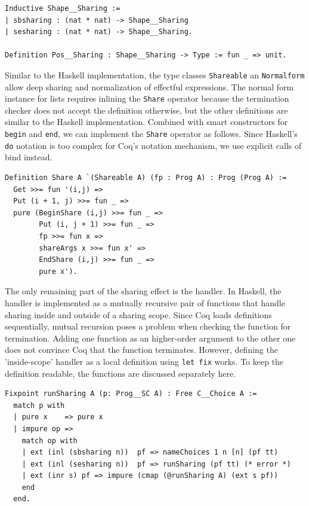 \documentclass[a4paper, 11pt, fleqn, twoside]{scrreprt}
\newcommand{\hinl}[1]{\texttt{#1}}
\newcommand{\cinl}[1]{\texttt{#1}}
\begin{document}
\begin{verbatim}
Inductive Shape__Sharing :=
| sbsharing : (nat * nat) -> Shape__Sharing
| sesharing : (nat * nat) -> Shape__Sharing.

Definition Pos__Sharing : Shape__Sharing -> Type := fun _ => unit.
\end{verbatim}

Similar to the Haskell implementation, the type classes \cinl{Shareable} an \cinl{Normalform} allow deep sharing and normalization of effectful expressions.
The normal form instance for lists requires inlining the \cinl{Share} operator because the termination checker does not accept the definition otherwise, but the other definitions are similar to the Haskell implementation.
Combined with smart constructors for \cinl{begin} and \cinl{end}, we can implement the \cinl{Share} operator as follows.
Since Haskell's \hinl{do} notation is too complex for Coq's notation mechanism, we use explicit calls of bind instead.

\begin{verbatim}
Definition Share A `(Shareable A) (fp : Prog A) : Prog (Prog A) :=
  Get >>= fun '(i,j) =>
  Put (i + 1, j) >>= fun _ =>
  pure (BeginShare (i,j) >>= fun _ =>
        Put (i, j + 1) >>= fun _ =>
        fp >>= fun x =>
        shareArgs x >>= fun x' =>
        EndShare (i,j) >>= fun _ =>
        pure x').
\end{verbatim}

The only remaining part of the sharing effect is the handler.
In Haskell, the handler is implemented as a mutually recursive pair of functions that handle sharing inside and outside of a sharing scope.
Since Coq loads definitions sequentially, mutual recursion poses a problem when checking the function for termination.
Adding one function as an higher-order argument to the other one does not convince Coq that the function terminates.
However, defining the 'inside-scope' handler as a local definition using \cinl{let fix} works.
To keep the definition readable, the functions are discussed separately here.

\begin{verbatim}
Fixpoint runSharing A (p: Prog__SC A) : Free C__Choice A :=
  match p with
  | pure x    => pure x
  | impure op =>
    match op with
    | ext (inl (sbsharing n))  pf => nameChoices 1 n [n] (pf tt)
    | ext (inl (sesharing n))  pf => runSharing (pf tt) (* error *)
    | ext (inr s) pf => impure (cmap (@runSharing A) (ext s pf))
    end
  end.
\end{verbatim}
\end{document}
